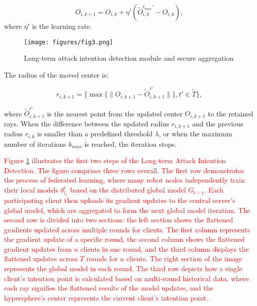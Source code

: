 \documentclass[lettersize,journal]{IEEEtran}
\begin{document}
\begin{equation}
O_{i,k+1} = O_{i,k} + \eta' (\tilde{O}_{i,k}^{t_{max}'}-O_{i,k}),
\end{equation}
where $\eta'$ is the learning rate. 

\begin{figure}[!ht]
    \centering
    \texttt{[image: figures/fig3.png]}
    \caption{Long-term attack intention detection module and secure aggregation}
    \label{fig3:longterm}
\end{figure}

The radius of the moved center is:

\begin{equation}
r_{i,k+1} =  \{ \max\{\| O_{i,k+1}-\tilde O_{i,k+1}^{t'} \|\}, t'\in \tilde T\} ,
\end{equation}



where $\tilde O_{i,k+1}^{t'}$ is the nearest point from the updated center $O_{i,k+1}$ to the retained rays. When the difference between the updated radius \( r_{i,k+1} \) and the previous radius \( r_{i,k} \) is smaller than a predefined threshold \( \lambda \), or when the maximum number of iterations $k_{max}$ is reached, the iteration stops.

\textcolor{red}{Figure \ref{fig3:longterm} illustrates the first two steps of the Long-term Attack Intention Detection. The figure comprises three rows overall. The first row demonstrates the process of federated learning, where many robot nodes independently train their local models \( \theta^t_{l_1} \) based on the distributed global model \( G_{t-1} \). Each participating client then uploads its gradient updates to the central server's global model, which are aggregated to form the next global model iteration. The second row is divided into two sections: the left section shows the flattened gradients updated across multiple rounds for clients. The first column represents the gradient update of a specific round, the second column shows the flattened gradient updates from \( n \) clients in one round, and the third column displays the flattened updates across \( T \) rounds for \( n \) clients. The right section of the image represents the global model in each round. The third row depicts how a single client's intention point is calculated based on multi-round historical data, where each ray signifies the flattened results of the model updates, and the hypersphere's center represents the current client's intention point.}
\end{document}

